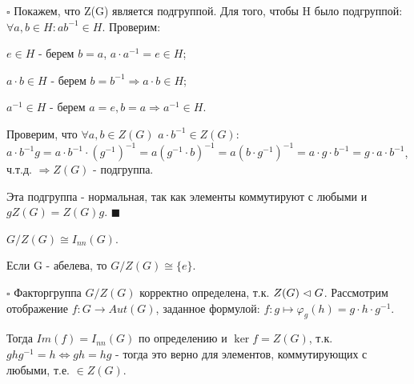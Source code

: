\documentclass[../main.tex]{subfiles}
\begin{document}
\void
$\square$ Покажем, что Z(G) является подгруппой. Для того, чтобы H было подгруппой:
$\forall a,b\in H: ab^{-1}\in H$. Проверим:

\void{} $e\in H$ - берем $b = a$, $a\cdot a^{-1} = e\in H$;

 $a\cdot b\in H$ - берем $b = b^{-1} \Longrightarrow a\cdot b\in H$;

 $a^{-1}\in H$ - берем $a = e, b = a \Longrightarrow a^{-1}\in H$.

Проверим, что $\forall a, b\in Z(G)$ $a\cdot b^{-1}\in Z(G)$: $a\cdot b^{-1}g = a\cdot b^{-1}\cdot(g^{-1})^{-1} =
a(g^{-1}\cdot b)^{-1} = a(b\cdot g^{-1})^{-1} = a\cdot g\cdot b^{-1} = g\cdot a\cdot b^{-1}$, ч.т.д.
$\Longrightarrow Z(G)$ - подгруппа.

Эта подгруппа - нормальная, так как элементы коммутируют с любыми и $gZ(G) = Z(G)g$. $\blacksquare$

\void{} $G/Z(G) \cong I_{nn}(G)$.

\void{} Если G - абелева, то $G/Z(G) \cong \{e\}$.

\void
$\square$ Факторгруппа $G/Z(G)$ корректно определена, т.к. $Z(G)\vartriangleleft G$.
Рассмотрим отображение $f: G\rightarrow Aut(G)$, заданное формулой:
$f: g\mapsto \varphi_g(h) = g\cdot h\cdot g^{-1}$.

Тогда $Im(f) = I_{nn}(G)$ по определению и $\ker{f} = Z(G)$, т.к. $ghg^{-1} = h \Longleftrightarrow
gh = hg$ - тогда это верно для элементов, коммутирующих с любыми, т.е. $\in Z(G)$.
\end{document}
